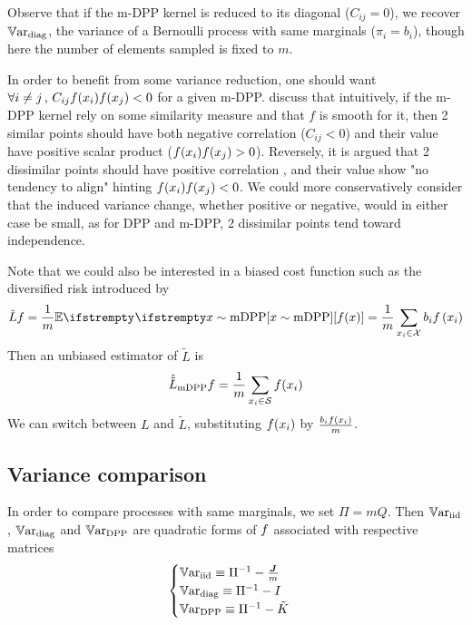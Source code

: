 Observe that if the m-DPP kernel is reduced to its diagonal ($C_{ij} = 0$), we recover $\operatorname{\mathbb V ar}_{\textrm{diag}}$, the variance of a Bernoulli process with same marginals ($\pi_i = b_i$), though here the number of elements sampled is fixed to $m$.

In order to benefit from some variance reduction, one should want $\forall i\neq j \,,\, C_{ij}f(x_i) f(x_j) <0$ for a given m-DPP.
\cite{zhang2017dppminibatch} discuss that intuitively, if the m-DPP kernel rely on some similarity measure and that $f$ is smooth for it, then 2 similar points should have both negative correlation ($C_{ij}<0$) and their value have positive scalar product ($f(x_i) f(x_j) > 0$). Reversely, it is argued that 2 dissimilar points should have positive correlation 
, and their value show "no tendency to align" hinting $f(x_i) f(x_j) < 0$. We could more conservatively consider that the induced variance change, whether positive or negative, would in either case be small, as for DPP and m-DPP, 2 dissimilar points tend toward independence.



Note that we could also be interested in a biased cost function such as the diversified risk introduced by \cite{zhang2017dppminibatch}
$$
\tilde L{\query} =\frac{1}{m}\EE{}{x \sim \textrm{mDPP}}[\query(x)]=\frac{1}{m}\sum_{x_i \in \mathcal X} b_{i} \query\left(x_{i}\right)
$$
Then an unbiased estimator of $\tilde L$ is
\begin{equation*}
	\hat{\tilde L}_{\textrm{mDPP}}{f} = \frac{1}{m}\sum_{x_i\in \mathcal S} f(x_i)
\end{equation*}
We can switch between $L$ and $\tilde L$, substituting $f(x_i)$ by $\frac{b_i f(x_i)}{m}$.


\subsection{Variance comparison}
In order to compare processes with same marginals, we set $\Pi = mQ$. Then $\operatorname{\mathbb V ar}_{\textrm{iid}}$, $\operatorname{\mathbb V ar}_{\textrm{diag}}$ and $\operatorname{\mathbb V ar}_{\textrm{DPP}}$ are quadratic forms of $f$ associated with respective matrices
$$\begin{cases}
	\operatorname{\mathbb V ar}_{\textrm{iid}} \equiv \Pi^{-1} - \frac{\boldsymbol{J}}{m} \\
	\operatorname{\mathbb V ar}_{\textrm{diag}} \equiv \Pi^{-1} - I \\
	\operatorname{\mathbb V ar}_{\textrm{DPP}} \equiv \Pi^{-1} - \tilde K
\end{cases}$$

